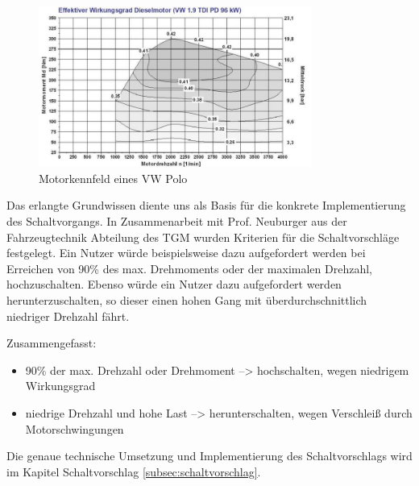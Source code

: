 \begin{figure}[!htb]\centering
	\includegraphics[width=0.8\textwidth]{images/poloMotorkennfeld}
	\caption{Motorkennfeld eines VW Polo 
	 \cite{SIMR.CH2-motorwirkungsgrad.SchwingungenMotorkennfeld}}\label{Fig:imgEngineVibrations}
\end{figure}

Das erlangte Grundwissen diente uns als Basis für die konkrete Implementierung des Schaltvorgangs.
In Zusammenarbeit mit Prof. Neuburger aus der Fahrzeugtechnik Abteilung des TGM wurden Kriterien für die Schaltvorschläge festgelegt. Ein Nutzer würde beispielsweise dazu aufgefordert werden bei Erreichen von 90\% des max. Drehmoments oder der maximalen Drehzahl, hochzuschalten. Ebenso würde ein Nutzer dazu aufgefordert werden herunterzuschalten, so dieser einen hohen Gang mit überdurchschnittlich niedriger Drehzahl fährt.

Zusammengefasst:
\begin{itemize}
	\item 90\% der max. Drehzahl oder Drehmoment --> hochschalten, wegen niedrigem Wirkungsgrad
	\item niedrige Drehzahl und hohe Last --> herunterschalten, wegen Verschleiß durch Motorschwingungen
\end{itemize}
Die genaue technische Umsetzung und Implementierung des Schaltvorschlags wird im Kapitel Schaltvorschlag \ref{subsec:schaltvorschlag}.

\clearpage %
